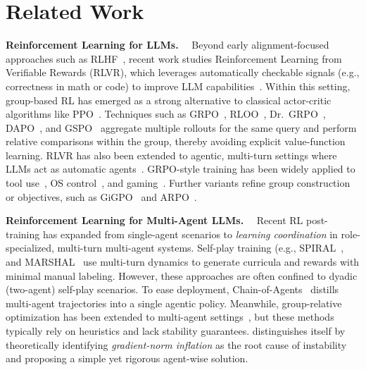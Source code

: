 \section{Related Work}
\textbf{Reinforcement Learning for LLMs.}~~
Beyond early alignment-focused approaches such as RLHF~\citep{ziegler2019fine,stiennon2020learning,ouyang2022training,rafailov2024direct}, recent work studies Reinforcement Learning from Verifiable Rewards (RLVR), which leverages automatically checkable signals (e.g., correctness in math or code) to improve LLM capabilities~\citep{zeng2025simplerl}.
Within this setting, group-based RL has emerged as a strong alternative to classical actor-critic algorithms like PPO~\citep{schulman2017proximal}. Techniques such as GRPO~\citep{shao2024deepseekmath}, RLOO~\citep{kool2019buy,ahmadian2024back},
Dr.~GRPO~\citep{liu2025understanding}, DAPO~\citep{yu2025dapo}, and GSPO~\citep{zheng2025group} aggregate multiple rollouts for the same query and perform relative comparisons within the group, thereby avoiding explicit value-function learning.
RLVR has also been extended to agentic, multi-turn settings where LLMs act as automatic agents~\citep{zhou2024archer,bai2024digirl,feng2025towards,wang2025spa,zhang2025agent,feng2026agentocr}. GRPO-style training has been widely applied to tool use~\citep{qian2025toolrl,xue2025simpletir}, OS control~\citep{lai2025computerrl}, and gaming~\citep{wang2025ragen}.
Further variants refine group construction or objectives, such as GiGPO~\citep{feng2025group} and ARPO~\citep{dong2025agentic}.


\textbf{Reinforcement Learning for Multi-Agent LLMs.}~~
Recent RL post-training has expanded from single-agent scenarios to \emph{learning coordination} in role-specialized, multi-turn multi-agent systems. Self-play training (e.g., SPIRAL~\citep{liu2025spiral}, and MARSHAL~\citep{yuan2025marshal} use multi-turn dynamics to generate curricula and rewards with minimal manual labeling. However, these approaches are often confined to dyadic (two-agent) self-play scenarios. To ease deployment, Chain-of-Agents~\citep{li2025chain} distills multi-agent trajectories into a single agentic policy. Meanwhile, group-relative optimization has been extended to multi-agent settings~\citep{liu2025llm,chen2025heterogeneous,li2025flow,park2025maporl,wan2025rema,xue2025comas,mo2025multi,hong2025multi}, but these methods typically rely on heuristics and lack stability guarantees. \methodname{} distinguishes itself by theoretically identifying \emph{gradient-norm inflation} as the root cause of instability and proposing a simple yet rigorous agent-wise solution.


